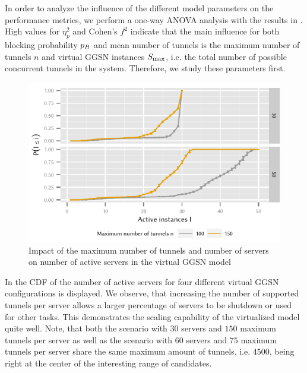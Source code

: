 In order to analyze the influence of the different model parameters on the performance metrics, we perform a one-way ANOVA analysis with the results in .
High values for \(\eta_p^2\) and Cohen's \(f^2\)\cite{Ellis2010} indicate that the main influence for both blocking probability \(p_B\) and mean number of tunnels is the maximum number of tunnels \(n\) and virtual \gls{GGSN} instances \(S_{\max}\), i.e. the total number of possible concurrent tunnels in the system.
Therefore, we study these parameters first.

\begin{figure}
  \centering
  \includegraphics{cloud/virtualized_network_functions/performance_evaluation/figures/instanceuse_multiserver}
  \caption{Impact of the maximum number of tunnels and number of servers on number of active servers in the virtual \gls{GGSN} model}
  \label{fig:cloud:virtualized_network_functions:performance_evaluation:virtual_ggsn:instanceuse_multiserver}
\end{figure}

In  the \gls{CDF} of the number of active servers for four different virtual \gls{GGSN} configurations is displayed.
We observe, that increasing the number of supported tunnels per server allows a larger percentage of servers to be shutdown or used for other tasks. This demonstrates the scaling capability of the virtualized model quite well.
Note, that both the scenario with \(30\) servers and \(150\) maximum tunnels per server as well as the scenario with \(60\) servers and \(75\) maximum tunnels per server share the same maximum amount of tunnels, i.e. \(4500\), being right at the center of the interesting range of candidates.

